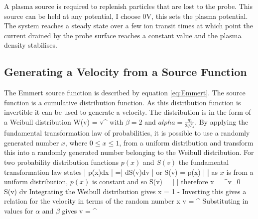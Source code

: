 A plasma source is required to replenish particles that are lost to the probe. This source can be held at any potential, I choose 0V, this sets the plasma potential. The system reaches a steady state over a few ion transit times at which point the current drained by the probe surface reaches a constant value and the plasma density stabilises. 

\subsection{Generating a Velocity from a Source Function}
The Emmert source function is described by equation \ref{eq:Emmert}. The source function is a cumulative distribution function. As this distribution function is invertible it can be used to generate a velocity. The distribution  is in the form of a Weibull distribution 
\be
W(v) = \alpha \beta v^{} 
\ee 
with $\beta = 2$ and $alpha = \frac{m}{2qT_s}$. 
By applying the fundamental transformation law of probabilities, it is possible to use a randomly generated number $x$, where $0\leq x \leq 1$, from a uniform distribution and transform this into a randomly generated number belonging to the Weibull distribution. 
For two probability distribution functions $p(x)$ and $S(v)$ the fundamental transformation law states
\be 
\left|  {p(x)dx} \right| =\left| d{S(v)dv}  \right|
\ee
or 
\be 
S(v) = p(x) \left| \right|
\ee
as $x$ is from a uniform distribution, $p(x)$ is constant and so 
\be 
S(v) = \left|  \right|
\ee
therefore 
\be
x = \int^v_0 S(v) dv
\ee 
Integrating the Weibull distribution gives 
\be 
x = 1 - 
\ee 
Inverting this gives a relation for the velocity in terms of the random number x 
\be
v = ^{}
\ee 
Substituting in values for $\alpha$ and $\beta$ gives 
\be 
v = ^{}
\ee
